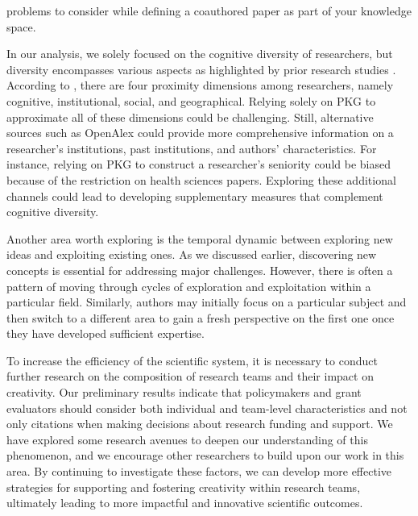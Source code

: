 problems to consider while defining a coauthored paper as part of your knowledge space.

In our analysis, we solely focused on the cognitive diversity of researchers, but diversity encompasses various aspects as highlighted by prior research studies \citep{medin2012diversity, hofstra2020diversity}. According to \cite{koopmann2021proximity},  there are four proximity dimensions among researchers, namely cognitive, institutional, social, and geographical. Relying solely on PKG to approximate all of these dimensions could be challenging. Still, alternative sources such as OpenAlex could provide more comprehensive information on a researcher's institutions, past institutions, and authors' characteristics. For instance, relying on PKG to construct a researcher's seniority could be biased because of the restriction on health sciences papers. Exploring these additional channels could lead to developing supplementary measures that complement cognitive diversity.

Another area worth exploring is the temporal dynamic between exploring new ideas and exploiting existing ones. As we discussed earlier, discovering new concepts is essential for addressing major challenges. However, there is often a pattern of moving through cycles of exploration and exploitation within a particular field. Similarly, authors may initially focus on a particular subject and then switch to a different area to gain a fresh perspective on the first one once they have developed sufficient expertise.
 
To increase the efficiency of the scientific system, it is necessary to conduct further research on the composition of research teams and their impact on creativity. Our preliminary results indicate that policymakers and grant evaluators should consider both individual and team-level characteristics and not only citations when making decisions about research funding and support. We have explored some research avenues to deepen our understanding of this phenomenon, and we encourage other researchers to build upon our work in this area. By continuing to investigate these factors, we can develop more effective strategies for supporting and fostering creativity within research teams, ultimately leading to more impactful and innovative scientific outcomes.




